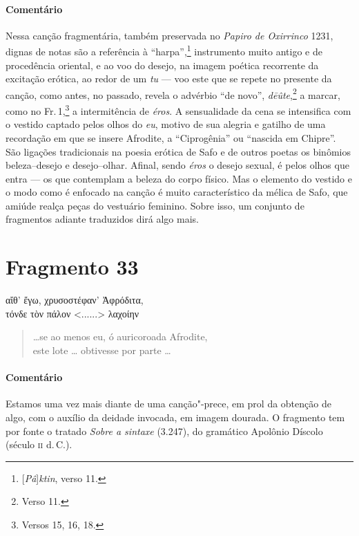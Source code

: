 \medskip

{\paragraph{Comentário} Nessa canção fragmentária, também preservada no \emph{Papiro de Oxirrinco}
1231, dignas de notas são a referência à ``harpa'',\footnote{[\emph{Pâ}]\emph{ktin}, verso 11.} instrumento muito
antigo e de procedência oriental, e ao voo do desejo, na imagem poética
recorrente da excitação erótica, ao redor de um \emph{tu} --- voo este que se repete
no presente da canção, como antes, no passado, revela o advérbio ``de
novo'', \emph{dēûte},\footnote{Verso 11.} a marcar, como no Fr.\,1,\footnote{Versos 15, 16, 18.} a intermitência de \emph{éros}. A sensualidade da cena se intensifica com o vestido captado pelos olhos do \emph{eu}, motivo de sua alegria e gatilho de uma recordação em que se insere Afrodite, a
``Ciprogênia'' ou ``nascida em Chipre''. São ligações tradicionais na
poesia erótica de Safo e de outros poetas os binômios beleza--desejo e
desejo--olhar. Afinal, sendo \emph{éros} o desejo sexual, é pelos olhos que entra --- os que contemplam a beleza do corpo físico. Mas o elemento do vestido e o modo como é enfocado na canção é muito característico da mélica de Safo, que amiúde realça peças do vestuário feminino. Sobre isso, um conjunto de fragmentos adiante traduzidos dirá algo mais.}




\section{Fragmento 33}

\begin{gkverse}
αἴθ’ ἔγω, χρυσοστέφαν’ Ἀφρόδιτα,\\
τόνδε τὸν πάλον <......> λαχοίην
\end{gkverse}

\begin{verse}
\ldots{}se ao menos eu, ó auricoroada Afrodite,\\
este lote \ldots{} obtivesse por parte \ldots{}
\end{verse}

\medskip

{\paragraph{Comentário} Estamos uma vez mais diante de uma canção"-prece, em prol da obtenção de algo,
com o auxílio da deidade invocada, em imagem dourada. O fragmento tem por fonte
o tratado \emph{Sobre a sintaxe} (3.247), do gramático Apolônio Díscolo (século
\textsc{ii} d.\,C.).}





